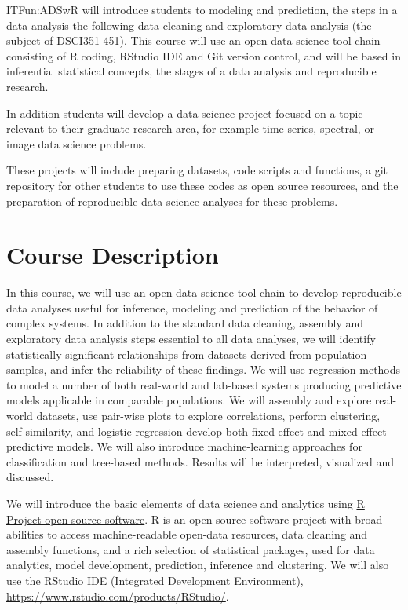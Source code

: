 \documentclass[11pt]{article} %
\begin{document}
ITFun:ADSwR will introduce students to modeling and prediction, the steps in a data analysis the following data cleaning and exploratory data analysis (the subject of DSCI351-451). 
This course will use an open data science tool chain consisting of R coding, RStudio IDE and Git version control, and will be based in inferential statistical concepts, the stages of a data analysis and reproducible research. 

In addition students will develop a data science project focused on a topic relevant to their graduate research area, for example time-series, spectral, or image data science problems. 

These projects will include preparing datasets, code scripts and functions, a git repository for other students to use these codes as open source resources, and the preparation of reproducible data science analyses for these problems. 

\section{Course Description}

In this course, we will use an open data science tool chain to develop reproducible data analyses useful for inference, modeling and prediction of the behavior of complex systems. 
In addition to the standard data cleaning, assembly and exploratory data analysis steps essential to all data analyses, we will identify statistically significant relationships from datasets derived from population samples, and infer the reliability of these findings. 
We will use regression methods to model a number of both real-world and lab-based systems producing predictive models applicable in comparable populations. 
We will assembly and explore real-world datasets, use pair-wise plots to explore correlations, perform clustering, self-similarity, and logistic regression develop both fixed-effect and mixed-effect predictive models. 
We will also introduce machine-learning approaches for classification and tree-based methods. 
Results will be interpreted, visualized and discussed. 

We will introduce the basic elements of data science and analytics using \href{"http://cran.case.edu/"}{R Project open source software}. 
R is an open-source software project with broad abilities to access machine-readable open-data resources, data cleaning and assembly functions, and a rich selection of statistical packages, used for data analytics, model development, prediction, inference and clustering. 
We will also use the RStudio IDE (Integrated Development Environment), \href{"https://www.rstudio.com/products/RStudio/''}{https://www.rstudio.com/products/RStudio/}. 
\end{document}
